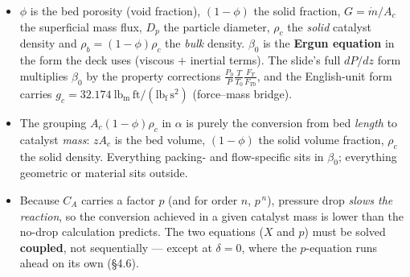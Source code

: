 \documentclass[10pt,a4paper]{article}
\begin{document}
\begin{itemize}
\item \textbf{$\phi$} is the bed porosity (void fraction), $(1-\phi)$ the solid fraction, $G = \dot m/A_c$ the
superficial mass flux, $D_p$ the particle diameter, $\rho_c$ the \emph{solid} catalyst density and
$\rho_b = (1-\phi)\rho_c$ the \emph{bulk} density. $\beta_0$ is the \textbf{Ergun equation} in the form the deck
uses (viscous $+$ inertial terms). The slide's full $dP/dz$ form multiplies $\beta_0$ by the property corrections
$\frac{P_0}{P}\frac{T}{T_0}\frac{F_T}{F_{T0}}$, and the English-unit form carries
$g_c = 32.174\ \mathrm{lb_m\,ft/(lb_f\,s^2)}$ (force--mass bridge).
\item The grouping $A_c(1-\phi)\rho_c$ in $\alpha$ is purely the conversion from bed \emph{length} to catalyst
\emph{mass}: $zA_c$ is the bed volume, $(1-\phi)$ the solid volume fraction, $\rho_c$ the solid density.
Everything packing- and flow-specific sits in $\beta_0$; everything geometric or material sits outside.
\item Because $C_A$ carries a factor $p$ (and for order $n$, $p^{\,n}$), pressure drop \emph{slows the reaction},
so the conversion achieved in a given catalyst mass is lower than the no-drop calculation predicts. The two
equations ($X$ and $p$) must be solved \textbf{coupled}, not sequentially --- except at $\delta = 0$, where the
$p$-equation runs ahead on its own (\S4.6).
\end{itemize}
\end{document}
